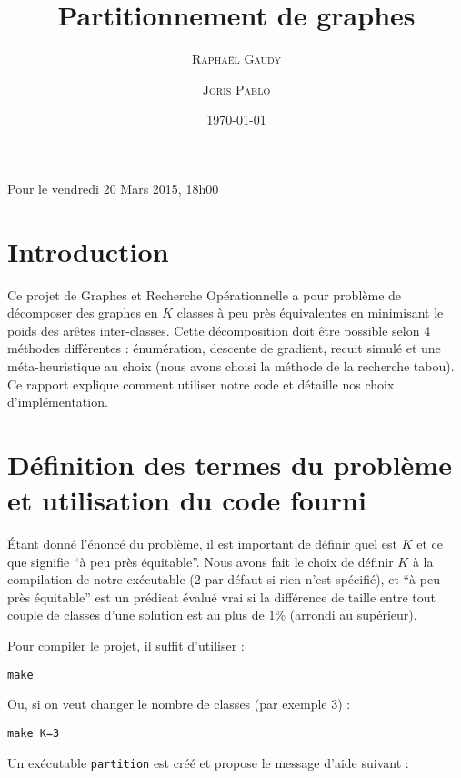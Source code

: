 \documentclass[12pt, a4paper]{article}
\begin{document}
\newcommand\Nom\textsc
\newcommand\Terme\textit

\title{Partitionnement de graphes}
\author{\Nom{Raphaël Gaudy} \and \Nom{Joris Pablo}}
\date\today
\maketitle

\begin{center}
Pour le vendredi 20 Mars 2015, 18h00
\end{center}

\section{Introduction}
Ce projet de Graphes et Recherche Opérationnelle a pour problème de décomposer des graphes en $K$ classes à peu près équivalentes en minimisant le poids des arêtes inter-classes. Cette décomposition doit être possible selon 4 méthodes différentes : énumération, descente de gradient, recuit simulé et une méta-heuristique au choix (nous avons choisi la méthode de la recherche tabou). Ce rapport explique comment utiliser notre code et détaille nos choix d'implémentation.

\section{Définition des termes du problème et utilisation du code fourni}
\'Etant donné l'énoncé du problème, il est important de définir quel est $K$ et ce que signifie ``à peu près équitable''. Nous avons fait le choix de définir $K$ à la compilation de notre exécutable (2 par défaut si rien n'est spécifié), et ``à peu près équitable'' est un prédicat évalué vrai si la différence de taille entre tout couple de classes d'une solution est au plus de 1\% (arrondi au supérieur).

Pour compiler le projet, il suffit d'utiliser :

\begin{verbatim}
make
\end{verbatim}

Ou, si on veut changer le nombre de classes (par exemple 3) :

\begin{verbatim}
make K=3
\end{verbatim}

Un exécutable \texttt{partition} est créé et propose le message d'aide suivant :
\end{document}
